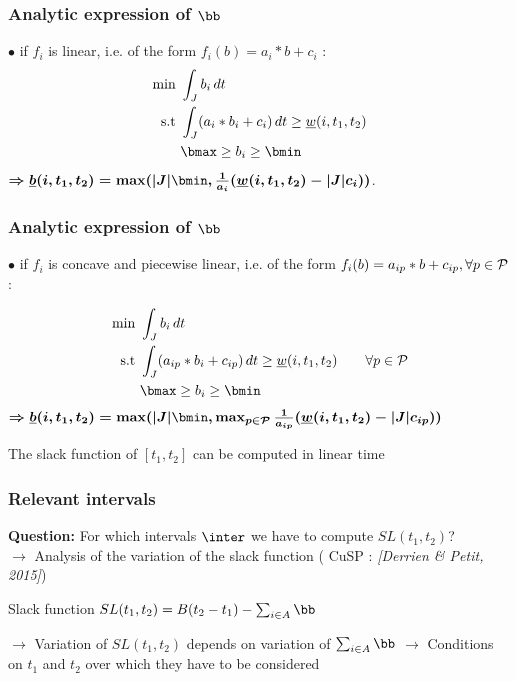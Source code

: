 \begin{frame}
  \frametitle{Analytic expression of $\bb$}
  \vfill
  $\bullet$ if $f_i$ is linear, i.e. of the form $f_i(b)= a_i*b+c_i$ :
  \pause
  \begin{align*}
    \text{min }  & \int_{J} b_i\,dt  \\
    \text{s.t } & \int_{J}(a_i*b_i+c_i)\,dt \ge
                  \underline{w}(i,t_1,t_2)\\
                 & \bmax \ge b_i \ge \bmin
  \end{align*}
  \pause
  { \color{blue!80!black!80}
    $\boldmath{\Rightarrow  \underline{b}(i,t_1,t_2)= \max ( |J|\bmin, \frac{1}{a_i}( \underline{w}(i,t_1,t_2)-|J|c_i))}$}.
  
\end{frame}

\begin{frame}
  \frametitle{Analytic expression of $\bb$}
  \vfill
  $\bullet$  if $f_i$ is concave and piecewise linear, i.e. of the form
  $f_i(b)=a_{ip}*b+c_{ip}, \forall p \in {\cal P}$:
  \pause

  \begin{align*}
    \text{min }  & \int_{J} b_i\,dt  \\
    \text{s.t } & \int_{J}(a_{ip}*b_i+c_{ip})\,dt \ge
                  \underline{w}(i,t_1,t_2) \qquad \forall p \in
                  {\cal P}\\
                 & \bmax \ge b_i \ge \bmin
  \end{align*}
  \pause
  { \color{blue!80!black!80}
    $\boldmath{\Rightarrow  \underline{b}(i,t_1,t_2)= \max ( |J|\bmin, \max_{p
        \in {\cal P}} \frac{1}{a_{ip}}( \underline{w}(i,t_1,t_2)-|J|c_{ip}))}$}
  \vfill
  \begin{prop}
    The slack function of $[t_1,t_2]$ can be computed in linear time
  \end{prop}
\end{frame}


\begin{frame}
  \frametitle{Relevant intervals}
  {\bf Question: } For which intervals $\inter$ we have to compute $SL(t_1,t_2)$?\\
  \vfill
  \pause
  $\rightarrow$ Analysis of the variation of the slack function (
  {\small CuSP : \it \color{gray!50!black!50} [Derrien \& Petit, 2015]})\\
  \vfill
  \pause
  \begin{block}{Slack function}
    \centering $SL(t_1,t_2)=B(t_2-t_1) - \sum_{i \in A} \bb$
  \end{block}
  \pause
  \vspace{0.8cm}
  $\rightarrow$ Variation of $SL(t_1,t_2)$ depends on variation of 
  $\sum_{i \in A} \bb$
  \vfill 
  \pause
  $\rightarrow$ Conditions on $t_1$ and $t_2$ over which they have to be
  considered 
  \vfill 
\end{frame}

